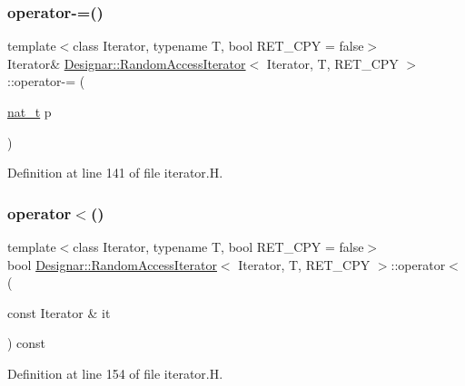 \subsubsection{\texorpdfstring{operator-\/=()}{operator-=()}}
{\footnotesize\ttfamily template$<$class Iterator, typename T, bool R\+E\+T\+\_\+\+C\+PY = false$>$ \\
Iterator\& \hyperlink{class_designar_1_1_random_access_iterator}{Designar\+::\+Random\+Access\+Iterator}$<$ Iterator, T, R\+E\+T\+\_\+\+C\+PY $>$\+::operator-\/= (\begin{DoxyParamCaption}\item[{\hyperlink{namespace_designar_aa72662848b9f4815e7bf31a7cf3e33d1}{nat\+\_\+t}}]{p }\end{DoxyParamCaption})\hspace{0.3cm}{\ttfamily [inline]}}



Definition at line 141 of file iterator.\+H.

\mbox{\label{class_designar_1_1_random_access_iterator_ad37f72e55f884ad8f41d4426f2e34d01}} 
\subsubsection{\texorpdfstring{operator$<$()}{operator<()}}
{\footnotesize\ttfamily template$<$class Iterator, typename T, bool R\+E\+T\+\_\+\+C\+PY = false$>$ \\
bool \hyperlink{class_designar_1_1_random_access_iterator}{Designar\+::\+Random\+Access\+Iterator}$<$ Iterator, T, R\+E\+T\+\_\+\+C\+PY $>$\+::operator$<$ (\begin{DoxyParamCaption}\item[{const Iterator \&}]{it }\end{DoxyParamCaption}) const\hspace{0.3cm}{\ttfamily [inline]}}



Definition at line 154 of file iterator.\+H.

\mbox{\label{class_designar_1_1_random_access_iterator_a1e3696df89803b90124dae7b648bd875}} 
